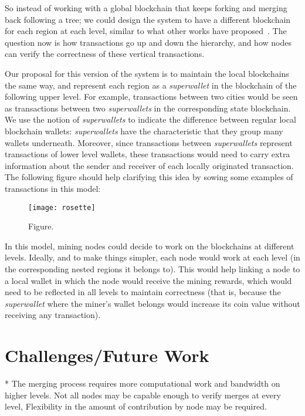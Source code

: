 So instead of working with a global blockchain that keeps forking and merging
back following a tree; we could design the system to have a different
blockchain for each region at each level, similar to what other works have
proposed~\cite{unchain}.  The question now is how transactions go up and down
the hierarchy, and how nodes can verify the correctness of these vertical
transactions.

Our proposal for this version of the system is to maintain the local
blockchains the same way, and represent each region as a \textit{superwallet}
in the blockchain of the following upper level.  For example, transactions
between two cities would be seen as transactions between two
\textit{superwallets} in the corresponding state blockchain.  We use the notion
of \textit{superwallets} to indicate the difference between regular local
blockchain wallets: \textit{superwallets} have the characteristic that they
group many wallets underneath.  Moreover, since transactions between
\textit{superwallets} represent transactions of lower level wallets, these
transactions would need to carry extra information about the sender and
receiver of each locally originated transaction.  The following figure should
help clarifying this idea by sowing some examples of transactions in this
model:

\begin{figure}
\texttt{[image: rosette]}
\caption{Figure.}
\end{figure}

In this model, mining nodes could decide to work on the blockchains at
different levels.  Ideally, and to make things simpler, each node would work at
each level (in the corresponding nested regions it belongs to).  This would
help linking a node to a local wallet in which the node would receive the
mining rewards, which would need to be reflected in all levels to maintain
correctness (that is, because the \textit{superwallet} where the miner's wallet
belongs would increase its coin value without receiving any transaction).

\section{Challenges/Future Work}

* The merging process requires more computational work and bandwidth on higher
levels.  Not all nodes may be capable enough to verify merges at every level,
Flexibility in the amount of contribution by node may be required.

